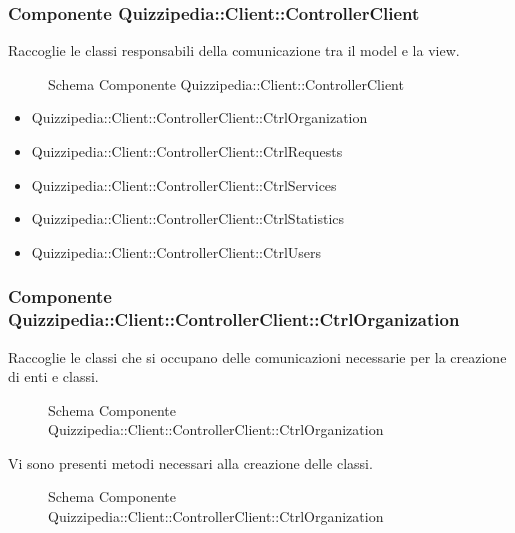 \subsubsection{Componente Quizzipedia::Client::ControllerClient}
Raccoglie le classi responsabili della comunicazione tra il model e la view.
\begin{figure}[H]
\centering
\noindent{}
\caption{Schema Componente Quizzipedia::Client::ControllerClient}
\end{figure}
\begin{itemize}
\item Quizzipedia::Client::ControllerClient::CtrlOrganization
\item Quizzipedia::Client::ControllerClient::CtrlRequests
\item Quizzipedia::Client::ControllerClient::CtrlServices
\item Quizzipedia::Client::ControllerClient::CtrlStatistics
\item Quizzipedia::Client::ControllerClient::CtrlUsers
\end{itemize}
\subsubsection{Componente Quizzipedia::Client::ControllerClient::CtrlOrganization}
Raccoglie le classi che si occupano delle comunicazioni necessarie per la creazione di enti e classi.
\begin{figure}[H]
\centering
\noindent{}
\caption{Schema Componente Quizzipedia::Client::ControllerClient::CtrlOrganization}
\end{figure}
Vi sono presenti metodi necessari alla creazione delle classi.
\begin{figure}[H]
\centering
\noindent{}
\caption{Schema Componente Quizzipedia::Client::ControllerClient::CtrlOrganization}
\end{figure}
